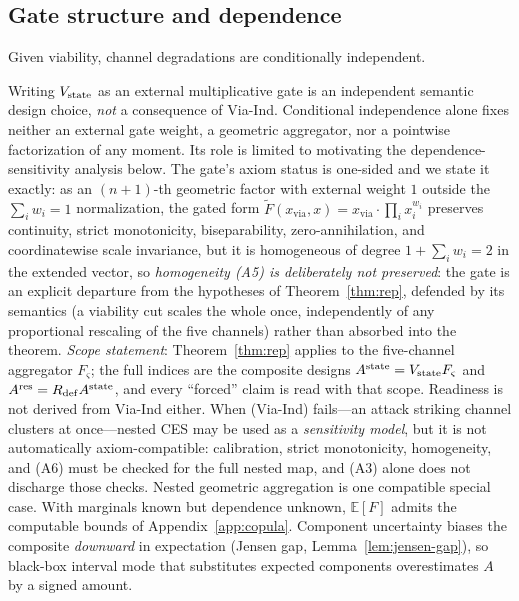 \subsection{Gate structure and dependence}

\begin{assumption}
\label{ass:via-ind}
Given viability, channel degradations are conditionally independent.
\end{assumption}

Writing $V_{\mathrm{state}}$ as an external multiplicative gate is an independent semantic
design choice, \emph{not} a consequence of Via-Ind. Conditional independence
alone fixes neither an external gate weight, a geometric aggregator, nor a
pointwise factorization of any moment. Its role is limited to motivating the
dependence-sensitivity analysis below. The gate's axiom status is
one-sided and we state it exactly: as an $(n{+}1)$-th geometric factor with
external weight $1$ outside the $\sum_iw_i=1$ normalization, the gated form
$\tilde F(x_{\mathrm{via}},x)=x_{\mathrm{via}}\cdot\prod_ix_i^{w_i}$ preserves
continuity, strict monotonicity, biseparability, zero-annihilation, and
coordinatewise scale invariance, but it is homogeneous of degree
$1+\sum_iw_i=2$ in the extended vector, so \emph{homogeneity \textup{(A5)} is
deliberately not preserved}: the gate is an explicit departure from the
hypotheses of Theorem~\ref{thm:rep}, defended by its semantics (a viability
cut scales the whole once, independently of any proportional rescaling of the
five channels) rather than absorbed into the theorem. \emph{Scope statement}:
Theorem~\ref{thm:rep} applies to the five-channel aggregator $F_\varsigma$;
the full indices are the composite designs
$A^{\mathrm{state}}=V_{\mathrm{state}} F_\varsigma$ and $A^{\mathrm{res}}=R_{\mathrm{def}}A^{\mathrm{state}}$, and every ``forced''
claim is read with that scope. Readiness is not derived from Via-Ind either.
When (Via-Ind) fails---an attack striking channel clusters at once---nested
CES may be used as a \emph{sensitivity model}, but it is not automatically
axiom-compatible: calibration, strict monotonicity, homogeneity, and (A6)
must be checked for the full nested map, and (A3) alone does not discharge
those checks. Nested geometric aggregation is one compatible special case.
With marginals known but dependence unknown, $\mathbb{E}[F]$ admits the
computable bounds of Appendix~\ref{app:copula}. Component uncertainty biases the composite
\emph{downward} in expectation (Jensen gap, Lemma~\ref{lem:jensen-gap}), so
black-box interval mode that substitutes expected components overestimates $A$
by a signed amount.
